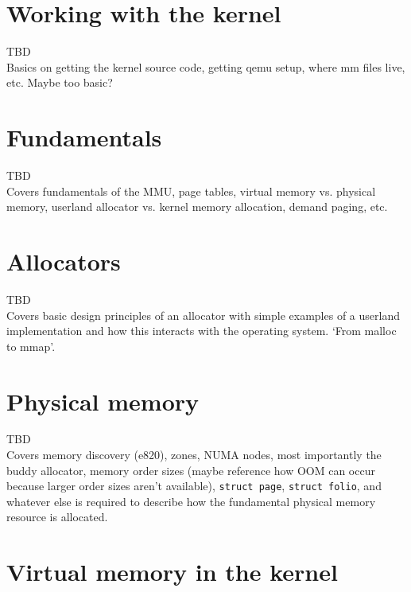 \documentclass[a4paper,oneside]{scrbook}
\begin{document}
\chapter{Working with the kernel}

TBD\\

Basics on getting the kernel source code, getting qemu setup, where mm files
live, etc. Maybe too basic?\\

\chapter{Fundamentals}

TBD\\

Covers fundamentals of the MMU, page tables, virtual memory vs. physical memory,
userland allocator vs. kernel memory allocation, demand paging, etc.\\

\chapter{Allocators}

TBD\\

Covers basic design principles of an allocator with simple examples of a
userland implementation and how this interacts with the operating system. `From
malloc to mmap'.\\

\chapter{Physical memory}

TBD\\

Covers memory discovery (e820), zones, NUMA nodes, most importantly the buddy
allocator, memory order sizes (maybe reference how OOM can occur because larger
order sizes aren't available), \texttt{struct page},
\texttt{struct folio}, and whatever else is required to describe how the
fundamental physical memory resource is allocated.\\

\chapter{Virtual memory in the kernel}
\end{document}
